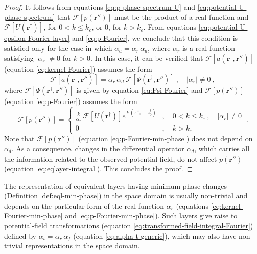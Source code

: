 \begin{proof}
	It follows from equations \ref{eq:p-phase-spectrum-U} and \ref{eq:potential-U-phase-spectrum} that 
	$\mathcal{F} [ p(\mathbf{r}'') ]$ must be the product of a real function and
	$\mathcal{F} [ U(\mathbf{r}^{\dagger}) ]$, for $0 < k \le k_{\varepsilon}$, or $0$, for $k > k_{\varepsilon}$.
	From equations \ref{eq:potential-U-epsilon-Fourier-layer} and \ref{eq:p-Fourier}, we conclude that this condition is satisfied only for the case in which 
	$\alpha_{a} = \alpha_{r} \, \alpha_{d}$, where $\alpha_{r}$ is a real function satisfying 
	$\left| \alpha_{r} \right| \ne 0$ for $k > 0$.
	In this case, it can be verified 
	that $\mathcal{F} [ a(\mathbf{r}^{\dagger}, \mathbf{r}'') ]$ (equation \ref{eq:kernel-Fourier}) 
	assumes the form
	\begin{equation}
		\mathcal{F} [ a(\mathbf{r}^{\dagger}, \mathbf{r}'') ] =
		\alpha_{r} \, \alpha_{d} \, 
		\mathcal{F} [ \Psi(\mathbf{r}^{\dagger}, \mathbf{r}'') ] \: ,
		\quad \left| \alpha_{r} \right| \ne 0 \: ,
		\label{eq:kernel-Fourier-min-phase}
	\end{equation}
	where $\mathcal{F} [ \Psi(\mathbf{r}^{\dagger}, \mathbf{r}'') ]$ is given by equation \ref{eq:Psi-Fourier} 
	and $\mathcal{F} [ p(\mathbf{r}'') ]$ (equation \ref{eq:p-Fourier}) assumes the form
	\begin{equation}
		\mathcal{F} [ p(\mathbf{r}'') ] =
		\begin{cases}
			\tfrac{k}{\alpha_{r}} \, \mathcal{F} [ U(\mathbf{r}^{\dagger}) ] 
			e^{\, k \, (z''_{0} - z^{\dagger}_{0})} & , 
			\quad 0 < k \le k_{\varepsilon} \: , \quad \left| \alpha_{r} \right| \ne 0 \\
			0 & , \quad k > k_{\varepsilon}
		\end{cases} \: .
		\label{eq:p-Fourier-min-phase}
	\end{equation}
	Note that $\mathcal{F} [ p(\mathbf{r}'') ]$ (equation \ref{eq:p-Fourier-min-phase}) does not depend on $\alpha_{d}$.
	As a consequence, changes in the differential operator $\alpha_{d}$, which carries all the information related to
	the observed potential field, do not affect $p(\mathbf{r}'')$ (equation \ref{eq:eqlayer-integral}).
	This concludes the proof.
\end{proof}

The representation of equivalent layers having minimum phase changes (Definition \ref{def:eql-min-phase}) in the
space domain is usually non-trivial and depends on the particular form of the real function $\alpha_{r}$ 
(equations \ref{eq:kernel-Fourier-min-phase} and \ref{eq:p-Fourier-min-phase}).
Such layers give raise to potential-field transformations (equation \ref{eq:transformed-field-integral-Fourier})
defined by $\alpha_{t} = \alpha_{r} \, \alpha_{f}$ (equation \ref{eq:alpha-t-generic}), which may also
have non-trivial representations in the space domain.

